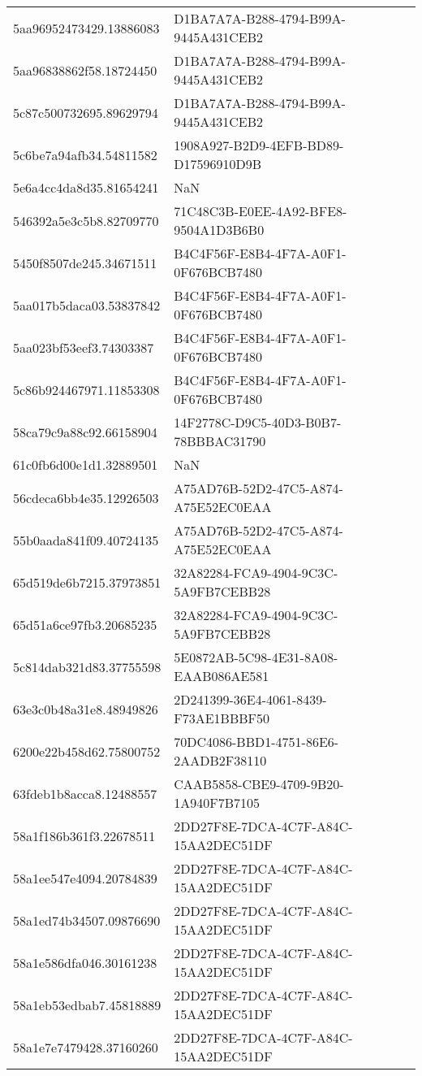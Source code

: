 \begin{tabular}{ll}
5aa96952473429.13886083 & D1BA7A7A-B288-4794-B99A-9445A431CEB2 \\
5aa96838862f58.18724450 & D1BA7A7A-B288-4794-B99A-9445A431CEB2 \\
5c87c500732695.89629794 & D1BA7A7A-B288-4794-B99A-9445A431CEB2 \\
5c6be7a94afb34.54811582 & 1908A927-B2D9-4EFB-BD89-D17596910D9B \\
5e6a4cc4da8d35.81654241 & NaN \\
546392a5e3c5b8.82709770 & 71C48C3B-E0EE-4A92-BFE8-9504A1D3B6B0 \\
5450f8507de245.34671511 & B4C4F56F-E8B4-4F7A-A0F1-0F676BCB7480 \\
5aa017b5daca03.53837842 & B4C4F56F-E8B4-4F7A-A0F1-0F676BCB7480 \\
5aa023bf53eef3.74303387 & B4C4F56F-E8B4-4F7A-A0F1-0F676BCB7480 \\
5c86b924467971.11853308 & B4C4F56F-E8B4-4F7A-A0F1-0F676BCB7480 \\
58ca79c9a88c92.66158904 & 14F2778C-D9C5-40D3-B0B7-78BBBAC31790 \\
61c0fb6d00e1d1.32889501 & NaN \\
56cdeca6bb4e35.12926503 & A75AD76B-52D2-47C5-A874-A75E52EC0EAA \\
55b0aada841f09.40724135 & A75AD76B-52D2-47C5-A874-A75E52EC0EAA \\
65d519de6b7215.37973851 & 32A82284-FCA9-4904-9C3C-5A9FB7CEBB28 \\
65d51a6ce97fb3.20685235 & 32A82284-FCA9-4904-9C3C-5A9FB7CEBB28 \\
5c814dab321d83.37755598 & 5E0872AB-5C98-4E31-8A08-EAAB086AE581 \\
63e3c0b48a31e8.48949826 & 2D241399-36E4-4061-8439-F73AE1BBBF50 \\
6200e22b458d62.75800752 & 70DC4086-BBD1-4751-86E6-2AADB2F38110 \\
63fdeb1b8acca8.12488557 & CAAB5858-CBE9-4709-9B20-1A940F7B7105 \\
58a1f186b361f3.22678511 & 2DD27F8E-7DCA-4C7F-A84C-15AA2DEC51DF \\
58a1ee547e4094.20784839 & 2DD27F8E-7DCA-4C7F-A84C-15AA2DEC51DF \\
58a1ed74b34507.09876690 & 2DD27F8E-7DCA-4C7F-A84C-15AA2DEC51DF \\
58a1e586dfa046.30161238 & 2DD27F8E-7DCA-4C7F-A84C-15AA2DEC51DF \\
58a1eb53edbab7.45818889 & 2DD27F8E-7DCA-4C7F-A84C-15AA2DEC51DF \\
58a1e7e7479428.37160260 & 2DD27F8E-7DCA-4C7F-A84C-15AA2DEC51DF \\

\end{tabular}
